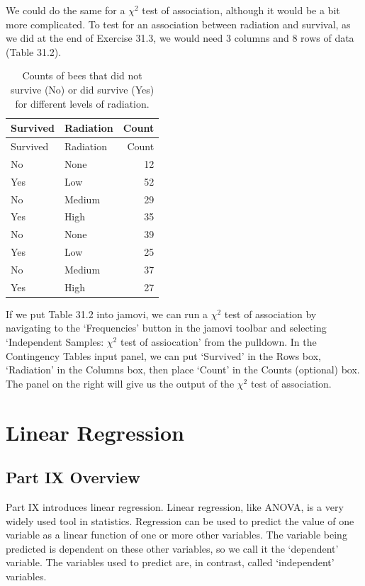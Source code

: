 \documentclass[
  openany]{scrbook}
\begin{document}
We could do the same for a \(\chi^{2}\) test of association, although it would be a bit more complicated.
To test for an association between radiation and survival, as we did at the end of Exercise 31.3, we would need 3 columns and 8 rows of data (Table 31.2).

\begin{longtable}[]{@{}llr@{}}
\caption{\label{tab:unnamed-chunk-138}Counts of bees that did not survive (No) or did survive (Yes) for different levels of radiation.}\tabularnewline
\toprule
Survived & Radiation & Count \\
\midrule
\endfirsthead
\toprule
Survived & Radiation & Count \\
\midrule
\endhead
No & None & 12 \\
Yes & Low & 52 \\
No & Medium & 29 \\
Yes & High & 35 \\
No & None & 39 \\
Yes & Low & 25 \\
No & Medium & 37 \\
Yes & High & 27 \\
\bottomrule
\end{longtable}

If we put Table 31.2 into jamovi, we can run a \(\chi^{2}\) test of association by navigating to the `Frequencies' button in the jamovi toolbar and selecting `Independent Samples: \(\chi^{2}\) test of assiocation' from the pulldown.
In the Contingency Tables input panel, we can put `Survived' in the Rows box, `Radiation' in the Columns box, then place `Count' in the Counts (optional) box.
The panel on the right will give us the output of the \(\chi^{2}\) test of association.

\hypertarget{part-linear-regression}{%
\part{Linear Regression}\label{part-linear-regression}}

\hypertarget{Week10}{%
\chapter*{Part IX Overview}\label{Week10}}

Part IX introduces linear regression.
Linear regression, like ANOVA, is a very widely used tool in statistics.
Regression can be used to predict the value of one variable as a linear function of one or more other variables.
The variable being predicted is dependent on these other variables, so we call it the `dependent' variable.
The variables used to predict are, in contrast, called `independent' variables.
\end{document}
